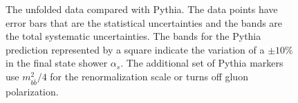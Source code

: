 \begin{figure}[htpb!]
\begin{center}
\caption[]{The unfolded data compared with Pythia. The data points have error bars that are the statistical uncertainties and the bands are the total systematic uncertainties. The bands for the Pythia prediction represented by a square indicate the variation of a $\pm10\%$ in the final state shower $\alpha_s$. The additional set of Pythia markers use $m_{b\bar b}^2/4$ for the renormalization scale or turns off gluon polarization.}
\label{fig:gbb-results}
\end{center}
\end{figure}


